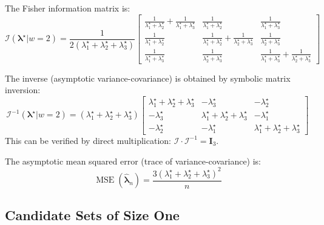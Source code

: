 \documentclass[12pt]{article}
\newcommand{\tparam}[1]{{#1}^{\star}}  %
\newcommand{\expomle}{\boldsymbol{\hat{\lambda}}_n}
\newcommand{\infomatrx}{\mathcal{I}}
\newcommand{\matrx}[1]{\mathbf{#1}}
\renewcommand{\vec}[1]{\boldsymbol{#1}}
\DeclareMathOperator{\MSE}{\mathrm{MSE}}
\theoremstyle{definition}
\theoremstyle{remark}
\begin{document}
The Fisher information matrix is:
\begingroup\small
\begin{equation}
\infomatrx(\tparam{\vec{\lambda}} | w{=}2) = \frac{1}{2(\tparam{\lambda}_1 + \tparam{\lambda}_2 + \tparam{\lambda}_3)}
\begin{bmatrix}
\frac{1}{\tparam{\lambda}_1+\tparam{\lambda}_2}+\frac{1}{\tparam{\lambda}_1+\tparam{\lambda}_3} & \frac{1}{\tparam{\lambda}_1+\tparam{\lambda}_2} & \frac{1}{\tparam{\lambda}_1+\tparam{\lambda}_3}\\[4pt]
\frac{1}{\tparam{\lambda}_1+\tparam{\lambda}_2} & \frac{1}{\tparam{\lambda}_1+\tparam{\lambda}_2}+\frac{1}{\tparam{\lambda}_2+\tparam{\lambda}_3} & \frac{1}{\tparam{\lambda}_2+\tparam{\lambda}_3}\\[4pt]
\frac{1}{\tparam{\lambda}_1+\tparam{\lambda}_3} & \frac{1}{\tparam{\lambda}_2+\tparam{\lambda}_3} & \frac{1}{\tparam{\lambda}_1+\tparam{\lambda}_3}+\frac{1}{\tparam{\lambda}_2+\tparam{\lambda}_3}
\end{bmatrix}
\end{equation}
\endgroup

The inverse (asymptotic variance-covariance) is obtained by symbolic matrix inversion:
\begin{equation}
\label{eq:expo_vcov_3comp_w2}
\infomatrx^{-1}(\tparam{\vec{\lambda}} | w=2) = (\tparam{\lambda}_1+\tparam{\lambda}_2+\tparam{\lambda}_3)
\begin{bmatrix}
\tparam{\lambda}_1+\tparam{\lambda}_2+\tparam{\lambda}_3 & -\tparam{\lambda}_3 & -\tparam{\lambda}_2\\
-\tparam{\lambda}_3 & \tparam{\lambda}_1+\tparam{\lambda}_2+\tparam{\lambda}_3 & -\tparam{\lambda}_1\\
-\tparam{\lambda}_2 & -\tparam{\lambda}_1 & \tparam{\lambda}_1+\tparam{\lambda}_2+\tparam{\lambda}_3
\end{bmatrix}
\end{equation}
This can be verified by direct multiplication: $\infomatrx \cdot \infomatrx^{-1} = \matrx{I}_3$.

The asymptotic mean squared error (trace of variance-covariance) is:
\begin{equation}
\MSE(\expomle) = \frac{3(\tparam{\lambda}_1 + \tparam{\lambda}_2 + \tparam{\lambda}_3)^2}{n}
\end{equation}

\subsection{Candidate Sets of Size One}
\end{document}
